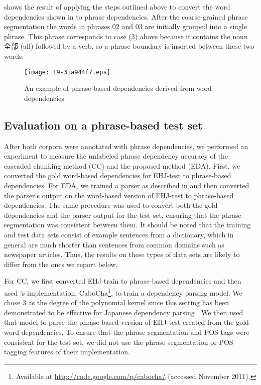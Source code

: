 \documentclass[english]{jnlp_1.4}
\def\figref#1{}
\def\secref#1{}
\begin{document}
\figref{figure:phrase_cabocha} shows the result of applying the steps
outlined above to convert the word dependencies shown in
\figref{figure:word_cabocha} to phrase dependencies. After the
coarse-grained phrase segmentation the words in phrases 02 and 03 are
initially grouped into a single phrase. This phrase corresponds to case
(3) above because it contains the noun 全部 (all) followed by a verb,
so a phrase boundary is inserted between these two words.

\begin{figure}[t]
  \begin{center}
\texttt{[image: 19-3ia944f7.eps]}
\end{center}
  \caption{An example of phrase-based dependencies derived from word dependencies}
  \label{figure:phrase_cabocha}
\end{figure}



\subsection{Evaluation on a phrase-based test set}
\label{sec:eval-phrase-based}

After both corpora were annotated with phrase dependencies, we
performed an experiment to measure the unlabeled phrase dependency
accuracy of the cascaded chunking method (CC) and the proposed method
(EDA). First, we converted the gold word-based dependencies for
EHJ-test to phrase-based dependencies. For EDA, we trained a parser as
described in \secref{sec:withFAC} and then converted the parser's
output on the word-based version of EHJ-test to phrase-based
dependencies. The same procedure was used to convert both the gold
dependencies and the parser output for the test set, ensuring that the
phrase segmentation was consistent between them. It should be noted
that the training and test data sets consist of example sentences from
a dictionary, which in general are much shorter than sentences from
common domains such as newspaper articles. Thus, the results on these
types of data sets are likely to differ from the ones we report below.

For CC, we first converted EHJ-train to phrase-based dependencies and
then used 's implementation,
CaboCha\footnote{Available at \url{http://code.google.com/p/cabocha/}
  (accessed November 2011).}, to train a dependency parsing model. We
chose 3 as the degree of the polynomial kernel since this setting has
been demonstrated to be effective for Japanese dependency parsing
\cite{kudo2000svm,kudo2002}. We then used that model to parse the
phrase-based version of EHJ-test created from the gold word
dependencies. To ensure that the phrase segmentation and POS tags were
consistent for the test set, we did not use the phrase segmentation or
POS tagging features of their implementation.
\end{document}
